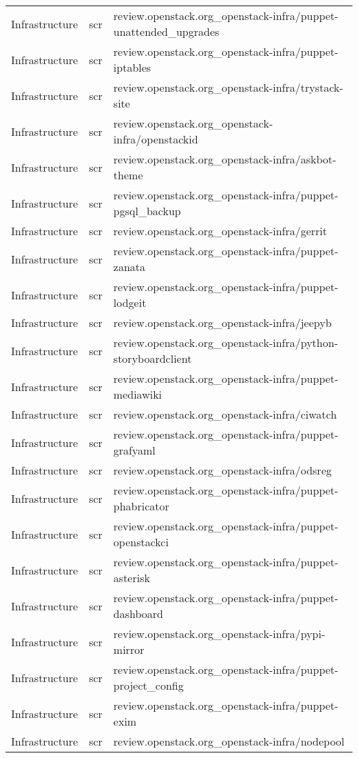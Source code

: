 \begin{center}
\begin{longtable}{|p{4cm}|p{1cm}|p{10cm}|}
Infrastructure&scr&review.openstack.org\_openstack-infra/puppet-unattended\_upgrades\\ 
Infrastructure&scr&review.openstack.org\_openstack-infra/puppet-iptables\\ 
Infrastructure&scr&review.openstack.org\_openstack-infra/trystack-site\\ 
Infrastructure&scr&review.openstack.org\_openstack-infra/openstackid\\ 
Infrastructure&scr&review.openstack.org\_openstack-infra/askbot-theme\\ 
Infrastructure&scr&review.openstack.org\_openstack-infra/puppet-pgsql\_backup\\ 
Infrastructure&scr&review.openstack.org\_openstack-infra/gerrit\\ 
Infrastructure&scr&review.openstack.org\_openstack-infra/puppet-zanata\\ 
Infrastructure&scr&review.openstack.org\_openstack-infra/puppet-lodgeit\\ 
Infrastructure&scr&review.openstack.org\_openstack-infra/jeepyb\\ 
Infrastructure&scr&review.openstack.org\_openstack-infra/python-storyboardclient\\ 
Infrastructure&scr&review.openstack.org\_openstack-infra/puppet-mediawiki\\ 
Infrastructure&scr&review.openstack.org\_openstack-infra/ciwatch\\ 
Infrastructure&scr&review.openstack.org\_openstack-infra/puppet-grafyaml\\ 
Infrastructure&scr&review.openstack.org\_openstack-infra/odsreg\\ 
Infrastructure&scr&review.openstack.org\_openstack-infra/puppet-phabricator\\ 
Infrastructure&scr&review.openstack.org\_openstack-infra/puppet-openstackci\\ 
Infrastructure&scr&review.openstack.org\_openstack-infra/puppet-asterisk\\ 
Infrastructure&scr&review.openstack.org\_openstack-infra/puppet-dashboard\\ 
Infrastructure&scr&review.openstack.org\_openstack-infra/pypi-mirror\\ 
Infrastructure&scr&review.openstack.org\_openstack-infra/puppet-project\_config\\ 
Infrastructure&scr&review.openstack.org\_openstack-infra/puppet-exim\\ 
Infrastructure&scr&review.openstack.org\_openstack-infra/nodepool\\ 

\end{longtable}
\end{center}
